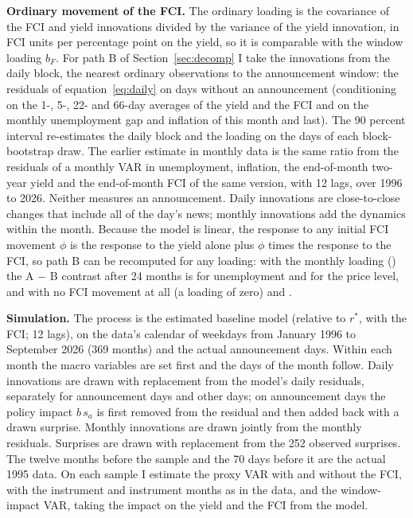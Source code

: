 \documentclass[11pt]{article}
\newcommand{\rs}{r^{*}}
\begin{document}
\begin{appendices}
\textbf{Ordinary movement of the FCI.} The ordinary loading is the covariance of the FCI and yield innovations divided by the variance of the yield innovation, in FCI units per percentage point on the yield, so it is comparable with the window loading $b_F$. For path B of Section~\ref{sec:decomp} I take the innovations from the daily block, the nearest ordinary observations to the announcement window: the residuals of equation~\eqref{eq:daily} on days without an announcement (conditioning on the 1-, 5-, 22- and 66-day averages of the yield and the FCI and on the monthly unemployment gap and inflation of this month and last). The 90 percent interval re-estimates the daily block and the loading on the days of each block-bootstrap draw. The earlier estimate in monthly data is the same ratio from the residuals of a monthly VAR in unemployment, inflation, the end-of-month two-year yield and the end-of-month FCI of the same version, with 12 lags, over 1996 to 2026. Neither measures an announcement. Daily innovations are close-to-close changes that include all of the day's news; monthly innovations add the dynamics within the month. Because the model is linear, the response to any initial FCI movement $\phi$ is the response to the yield alone plus $\phi$ times the response to the FCI, so path B can be recomputed for any loading: with the monthly loading () the A $-$ B contrast after 24 months is  for unemployment and  for the price level, and with no FCI movement at all (a loading of zero)  and .

\textbf{Simulation.} The process is the estimated baseline model (relative to $\rs$, with the FCI; 12 lags), on the data's calendar of weekdays from January 1996 to September 2026 (369 months) and the actual announcement days. Within each month the macro variables are set first and the days of the month follow. Daily innovations are drawn with replacement from the model's daily residuals, separately for announcement days and other days; on announcement days the policy impact $b\,s_a$ is first removed from the residual and then added back with a drawn surprise. Monthly innovations are drawn jointly from the monthly residuals. Surprises are drawn with replacement from the 252 observed surprises. The twelve months before the sample and the 70 days before it are the actual 1995 data. On each sample I estimate the proxy VAR with and without the FCI, with the instrument and instrument months as in the data, and the window-impact VAR, taking the impact on the yield and the FCI from the model.


\end{appendices}
\end{document}
